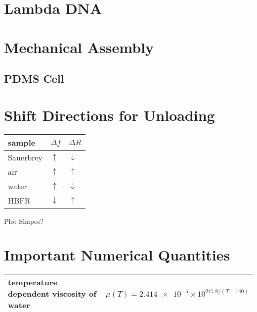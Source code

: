 \documentclass[a4paper]{article}
\begin{document}
\section{Lambda DNA}

\section{Mechanical Assembly}
\subsection{PDMS Cell}

\section{Shift Directions for Unloading}
\begin{tabular}{lll}
 \toprule
 sample & $\Delta f$ & $\Delta R$ \\
 \midrule
 Sauerbrey & $\uparrow$ &   $\downarrow$ \\
 air       & $\uparrow$ & $\uparrow$ \\
 water     & $\uparrow$ &   $\downarrow$ \\
 HBFR      & $\downarrow$ & $\uparrow$ \\
 \bottomrule
\end{tabular}

Plot Shapes?
\section{Important Numerical Quantities}
\begin{table}
 \centering
 \begin{tabularx}{\textwidth}{ l l }
  \toprule
  temperature dependent viscosity of water & $\mu(T)=\num{2.414e-5}\times 10^{247.8/(T-140)}$\\
  \bottomrule
 \end{tabularx}
\end{table}
\end{document}
